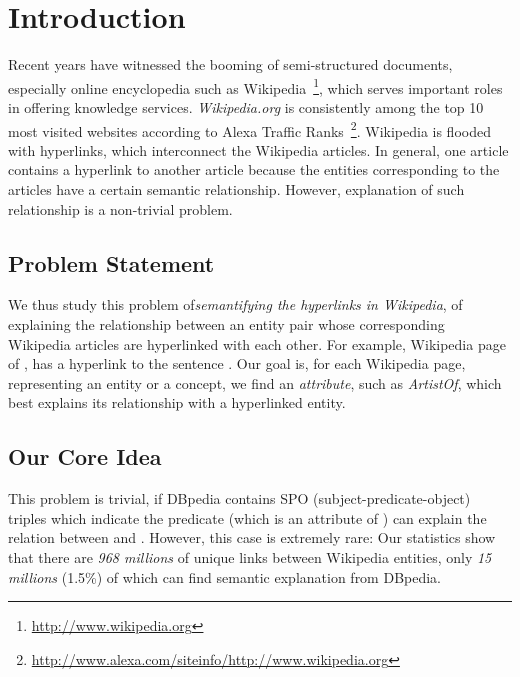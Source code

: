 \section{Introduction}

Recent years have witnessed the booming of semi-structured documents, especially online encyclopedia such as  Wikipedia~\footnote{\small\url{http://www.wikipedia.org}}, which serves important roles in offering knowledge services.
{\it Wikipedia.org} is consistently among the top 10 most visited websites according to Alexa Traffic Ranks~\footnote{\small\url{http://www.alexa.com/siteinfo/http://www.wikipedia.org}}.
Wikipedia is flooded with hyperlinks, which interconnect the Wikipedia articles.
In general, one article contains a hyperlink to another article because the entities corresponding to the articles have a certain semantic relationship.
However, explanation of such relationship is a non-trivial problem.

\subsection{Problem Statement}
We thus study this problem of{\it semantifying the hyperlinks in Wikipedia}, of 
explaining the relationship between an entity pair whose corresponding Wikipedia articles are hyperlinked with each other.
For example, Wikipedia page of , has a hyperlink to  the sentence .
Our goal is, for each Wikipedia page, representing an entity or a concept,
we find an \emph{attribute}, such as \emph{ArtistOf}, which best explains its relationship with a hyperlinked entity.


\subsection{Our Core Idea}

This problem is trivial, if DBpedia contains 
SPO (subject-predicate-object) triples  which indicate the predicate  (which is an attribute of ) can explain the relation between  and . However, this case is extremely rare:
Our statistics show that there are \emph{968 millions} of unique links between Wikipedia entities, only \emph{15 millions} (1.5\%) of which can find semantic explanation from DBpedia.

